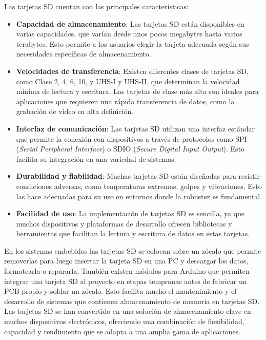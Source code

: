 Las tarjetas SD cuentan con las principales características: 
\begin{itemize}
    \item \textbf{Capacidad de almacenamiento}: Las tarjetas SD están disponibles en varias capacidades, que varían desde unos pocos megabytes hasta varios terabytes. Esto permite a los usuarios elegir la tarjeta adecuada según sus necesidades específicas de almacenamiento.
    \item \textbf{Velocidades de transferencia}: Existen diferentes clases de tarjetas SD, como Clase 2, 4, 6, 10, y UHS-I y UHS-II, que determinan la velocidad mínima de lectura y escritura. Las tarjetas de clase más alta son ideales para aplicaciones que requieren una rápida transferencia de datos, como la grabación de video en alta definición.
    \item \textbf{Interfaz de comunicación}: Las tarjetas SD utilizan una interfaz estándar que permite la conexión con dispositivos a través de protocolos como SPI (\textit{Serial Peripheral Interface}) o SDIO (\textit{Secure Digital Input Output}). Esto facilita su integración en una variedad de sistemas.
    \item \textbf{Durabilidad y fiabilidad}: Muchas tarjetas SD están diseñadas para resistir condiciones adversas, como temperaturas extremas, golpes y vibraciones. Esto las hace adecuadas para su uso en entornos donde la robustez es fundamental.
    \item \textbf{Facilidad de uso}: La implementación de tarjetas SD es sencilla, ya que muchos dispositivos y plataformas de desarrollo ofrecen bibliotecas y herramientas que facilitan la lectura y escritura de datos en estas tarjetas.
\end{itemize}



En los sistemas embebidos las tarjetas SD se colocan sobre un zócalo que permite removerlas para luego insertar la tarjeta SD en una PC y descargar los datos, formatearla o repararla. También existen módulos para Arduino que permiten integrar una tarjeta SD al proyecto en etapas tempranas antes de fabricar un PCB propio y soldar un zócalo. Esto facilita mucho el mantenimiento y el desarrollo de sistemas que contienen almacenamiento de memoria en tarjetas SD. Las tarjetas SD se han convertido en una solución de almacenamiento clave en muchos dispositivos electrónicos, ofreciendo una combinación de flexibilidad, capacidad y rendimiento que se adapta a una amplia gama de aplicaciones.